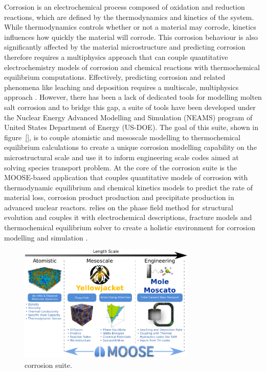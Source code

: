 	Corrosion is an electrochemical process composed of oxidation and reduction reactions, which are defined by the thermodynamics and kinetics of the system. While thermodynamics controls whether or not a material may corrode, kinetics influences how quickly the material will corrode. This corrosion behaviour is also significantly affected by the material microstructure and predicting corrosion therefore requires a multiphysics approach that can couple quantitative electrochemistry models of corrosion and chemical reactions with thermochemical equilibrium computations. Effectively, predicting corrosion and related phenomena like leaching and deposition requires a multiscale, multiphysics approach \cite{Mcmurray:2018aa}. However, there has been a lack of dedicated tools for modelling molten salt corrosion and to bridge this gap, a suite of tools have been developed under the Nuclear Energy Advanced Modelling and Simulation (NEAMS) program of United States Department of Energy (US-DOE). The goal of this suite, shown in figure~\ref{}, is to couple atomistic and mesoscale modelling to thermochemical equilibrium calculations to create a unique corrosion modelling capability on the microstructural scale and use it to inform engineering scale codes aimed at solving species transport problem. At the core of the corrosion suite is the MOOSE-based application {\YJ} that couples quantitative models of corrosion with thermodynamic equilibrium and chemical kinetics models to predict the rate of material loss, corrosion product production and precipitate production in advanced nuclear reactors. {\YJ} relies on the phase field method for structural evolution and couples it with electrochemical descriptions, fracture models and thermochemical equilibrium solver to create a holistic environment for corrosion modelling and simulation \cite{Bhave:2022aa}.
	\begin{figure}[htb]
		\centering
		\includegraphics[width=0.75\textwidth]{figures/chapter-1/Yellowjacket_Suite.png}
		\caption{{\YJ} corrosion suite.}
		\label{fig:yj_suite}
	\end{figure}

